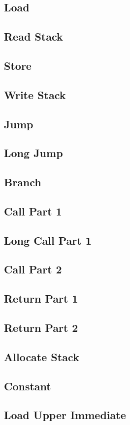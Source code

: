 \documentclass{report}
\begin{document}
		\subsection{Load}
		\subsection{Read Stack}
		\subsection{Store}
		\subsection{Write Stack}
		\subsection{Jump}
		\subsection{Long Jump}
		\subsection{Branch}
		\subsection{Call Part 1}

			


		\subsection{Long Call Part 1}
		\subsection{Call Part 2}
		\subsection{Return Part 1}
		\subsection{Return Part 2}
		\subsection{Allocate Stack}
		\subsection{Constant}
		\subsection{Load Upper Immediate}
\end{document}
